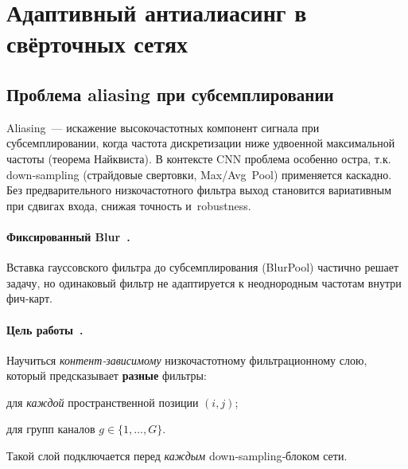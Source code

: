 

\section{Адаптивный антиалиасинг в свёрточных сетях}
\label{sec:adaptive_aa}

\subsection{Проблема aliasing при субсемплировании}

Aliasing — искажение высокочастотных компонент сигнала при субсемплировании, 
когда частота дискретизации ниже удвоенной максимальной частоты (теорема Найквиста).
В контексте CNN проблема особенно остра, т.к. down‑sampling (страйдовые свертовки,
Max\slash Avg Pool) применяется каскадно. Без предварительного низкочастотного
фильтра выход становится вариативным при сдвигах входа, снижая точность и robustness.

\paragraph{Фиксированный Blur \citep{Zhang2020ShiftInvariant}.} Вставка гауссовского
фильтра до субсемплирования (BlurPool) частично решает задачу, но одинаковый фильтр
не адаптируется к неоднородным частотам внутри фич‑карт.

\paragraph{Цель работы \citep{Zou2020AntiAliasing}.} Научиться 
\emph{контент‑зависимому} низкочастотному фильтрационному слою, который предсказывает
\textbf{разные} фильтры:
\begin{enumerate*}[label=\alph*)]
  \item для \textit{каждой} пространственной позиции $(i,j)$;\\[-4pt]
  \item для групп каналов $g\in\{1,\dots,G\}$.
\end{enumerate*}
Такой слой подключается перед \emph{каждым} down‑sampling‑блоком сети.

